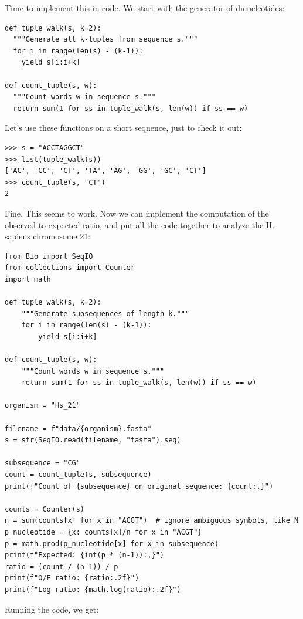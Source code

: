 Time to implement this in code. We start with the generator of dinucleotides:

\vspace*{3mm}
\begin{lstlisting}
def tuple_walk(s, k=2):
  """Generate all k-tuples from sequence s."""
  for i in range(len(s) - (k-1)):
    yield s[i:i+k]

def count_tuple(s, w):
  """Count words w in sequence s."""
  return sum(1 for ss in tuple_walk(s, len(w)) if ss == w)
\end{lstlisting}

Let's use these functions on a short sequence, just to check it out:

\vspace*{3mm}
\begin{lstlisting}
>>> s = "ACCTAGGCT"
>>> list(tuple_walk(s))
['AC', 'CC', 'CT', 'TA', 'AG', 'GG', 'GC', 'CT']
>>> count_tuple(s, "CT")
2
\end{lstlisting}

Fine. This seems to work. Now we can implement the computation of the observed-to-expected ratio, and put all the code together to analyze the H. sapiens chromosome 21:

\vspace*{3mm}
\begin{lstlisting}
from Bio import SeqIO
from collections import Counter
import math

def tuple_walk(s, k=2):
    """Generate subsequences of length k."""
    for i in range(len(s) - (k-1)):
        yield s[i:i+k]

def count_tuple(s, w):
    """Count words w in sequence s."""
    return sum(1 for ss in tuple_walk(s, len(w)) if ss == w)

organism = "Hs_21"

filename = f"data/{organism}.fasta"
s = str(SeqIO.read(filename, "fasta").seq)

subsequence = "CG"
count = count_tuple(s, subsequence)
print(f"Count of {subsequence} on original sequence: {count:,}")

counts = Counter(s)
n = sum(counts[x] for x in "ACGT")  # ignore ambiguous symbols, like N
p_nucleotide = {x: counts[x]/n for x in "ACGT"}
p = math.prod(p_nucleotide[x] for x in subsequence)
print(f"Expected: {int(p * (n-1)):,}")
ratio = (count / (n-1)) / p
print(f"O/E ratio: {ratio:.2f}")
print(f"Log ratio: {math.log(ratio):.2f}")
\end{lstlisting}

Running the code, we get:

